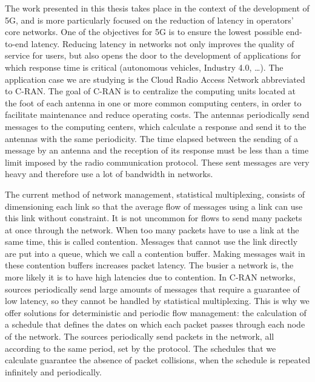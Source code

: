 \label{chap:introen}

The work presented in this thesis takes place in the context of the development of 5G, and is more particularly focused on the reduction of latency in operators' core networks.
One of the objectives for 5G is to ensure the lowest possible end-to-end latency.
Reducing latency in networks not only improves the quality of service for users, but also opens the door to the development of applications for which response time is critical (autonomous vehicles, Industry 4.0, \ldots).
The application case we are studying is the Cloud Radio Access Network abbreviated to C-RAN. The goal of C-RAN is to centralize the computing units located at the foot of each antenna in one or more common computing centers, in order to facilitate maintenance and reduce operating costs. The antennas periodically send messages to the computing centers, which calculate a response and send it to the antennas with the same periodicity. The time elapsed between the sending of a message by an antenna and the reception of its response must be less than a time limit imposed by the radio communication protocol. These sent messages are very heavy and therefore use a lot of bandwidth in networks.

The current method of network management, statistical multiplexing, consists of dimensioning each link so that the average flow of messages using a link can use this link without constraint. It is not uncommon for flows to send many packets at once through the network. When too many packets have to use a link at the same time, this is called contention. Messages that cannot use the link directly are put into a queue, which we call a contention buffer. Making messages wait in these contention buffers increases packet latency. The busier a network is, the more likely it is to have high latencies due to contention. In C-RAN networks, sources periodically send large amounts of messages that require a guarantee of low latency, so they cannot be handled by statistical multiplexing. This is why we offer solutions for deterministic and periodic flow management: the calculation of a schedule that defines the dates on which each packet passes through each node of the network. The sources periodically send packets in the network, all according to the same period, set by the protocol. The schedules that we calculate guarantee the absence of packet collisions, when the schedule is repeated infinitely and periodically.

